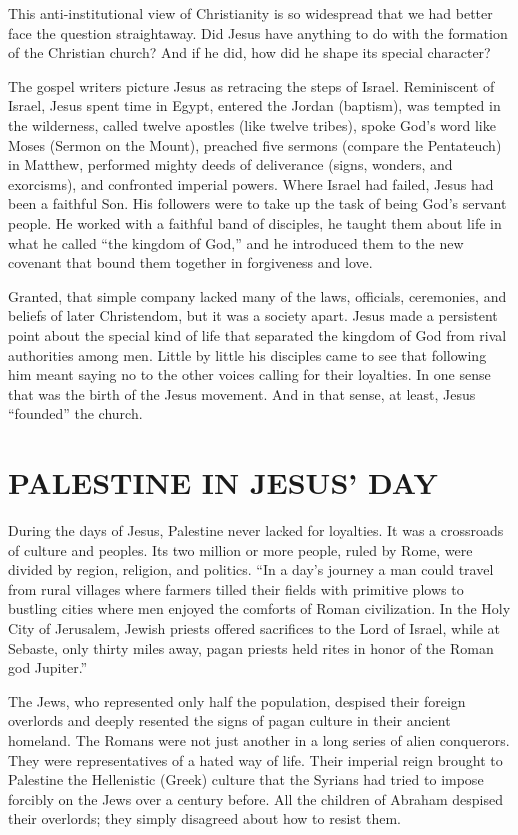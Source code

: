 This anti-institutional view of Christianity is so widespread that we had better face the question
straightaway. Did Jesus have anything to do with the formation of the Christian church? And if he
did, how did he shape its special character?

The gospel writers picture Jesus as retracing the steps of Israel. Reminiscent of Israel, Jesus
spent time in Egypt, entered the Jordan (baptism), was tempted in the wilderness, called twelve
apostles (like twelve tribes), spoke God’s word like Moses (Sermon on the Mount), preached five
sermons (compare the Pentateuch) in Matthew, performed mighty deeds of deliverance (signs, wonders,
and exorcisms), and confronted imperial powers. Where Israel had failed, Jesus had been a faithful
Son. His followers were to take up the task of being God’s servant people. He worked with a faithful
band of disciples, he taught them about life in what he called “the kingdom of God,” and he
introduced them to the new covenant that bound them together in forgiveness and love.

Granted, that simple company lacked many of the laws, officials, ceremonies, and beliefs of later
Christendom, but it was a society apart. Jesus made a persistent point about the special kind of
life that separated the kingdom of God from rival authorities among men. Little by little his
disciples came to see that following him meant saying no to the other voices calling for their
loyalties. In one sense that was the birth of the Jesus movement. And in that sense, at least, Jesus
“founded” the church.

\section{PALESTINE IN JESUS’ DAY}

During the days of Jesus, Palestine never lacked for loyalties. It was a crossroads of culture and
peoples. Its two million or more people, ruled by Rome, were divided by region, religion, and
politics. “In a day’s journey a man could travel from rural villages where farmers tilled their
fields with primitive plows to bustling cities where men enjoyed the comforts of Roman civilization.
In the Holy City of Jerusalem, Jewish priests offered sacrifices to the Lord of Israel, while at
Sebaste, only thirty miles away, pagan priests held rites in honor of the Roman god Jupiter.”

The Jews, who represented only half the population, despised their foreign overlords and deeply
resented the signs of pagan culture in their ancient homeland. The Romans were not just another in a
long series of alien conquerors. They were representatives of a hated way of life. Their imperial
reign brought to Palestine the Hellenistic (Greek) culture that the Syrians had tried to impose
forcibly on the Jews over a century before. All the children of Abraham despised their overlords;
they simply disagreed about how to resist them.

